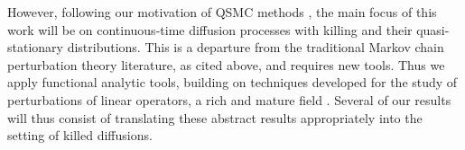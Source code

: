 \documentclass{aptpub}
\begin{document}
However, following our motivation of QSMC methods \cite{Pollock2020}, the main focus of this work will be on continuous-time diffusion processes with killing and their quasi-stationary distributions.
This is a departure from the traditional Markov chain perturbation theory literature, as cited above, and requires new tools.
Thus we apply functional analytic tools, building on techniques developed for the study of perturbations of linear operators, a rich and mature field \cite{Reed1978, Baumgartel1985,Kato1995}. Several of our results will thus consist of translating these abstract results appropriately into the setting of killed diffusions. %
\end{document}
